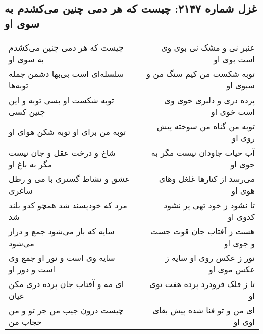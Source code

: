 \begin{center}
\section*{غزل شماره ۲۱۴۷: چیست که هر دمی چنین می‌کشدم به سوی او}
\label{sec:2147}
\begin{longtable}{l p{0.5cm} r}
چیست که هر دمی چنین می‌کشدم به سوی او
&&
عنبر نی و مشک نی بوی وی است بوی او
\\
سلسله‌ای است بی‌بها دشمن جمله توبه‌ها
&&
توبه شکست من کیم سنگ من و سبوی او
\\
توبه شکست او بسی توبه و این چنین کسی
&&
پرده دری و دلبری خوی وی است خوی او
\\
توبه من برای او توبه شکن هوای او
&&
توبه من گناه من سوخته پیش روی او
\\
شاخ و درخت عقل و جان نیست مگر به باغ او
&&
آب حیات جاودان نیست مگر به جوی او
\\
عشق و نشاط گستری با می و رطل ساغری
&&
می‌رسد از کنارها غلغل وهای هوی او
\\
مرد که خودپسند شد همچو کدو بلند شد
&&
تا نشود ز خود تهی پر نشود کدوی او
\\
سایه که باز می‌شود جمع و دراز می‌شود
&&
هست ز آفتاب جان قوت جست و جوی او
\\
سایه وی است و نور او جمع وی است و دور او
&&
نور ز عکس روی او سایه ز عکس موی او
\\
ای مه و آفتاب جان پرده دری مکن عیان
&&
تا ز فلک فرودرد پرده هفت توی او
\\
چیست درون جیب من جز تو و من حجاب من
&&
ای من و تو فنا شده پیش بقای اوی او
\\
\end{longtable}
\end{center}
